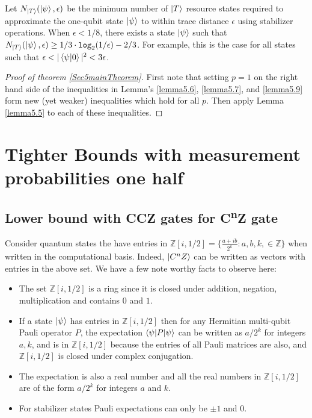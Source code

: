 \documentclass[12pt]{dalthesis}
\begin{document}
\begin{lemma}
\label{lemma5.9}
Let $N_{\ket{T}}(\ket{\psi} , \epsilon)$ be the minimum number of $\ket{T}$ resource states required to approximate the one-qubit state $\ket{\psi}$ to within trace distance $\epsilon$ using stabilizer operations. When $\epsilon < 1/8$, there exists a state $\ket{\psi}$ such that $N_{\ket{T}}(\ket{\psi} , \epsilon) \geq 1/3 \cdot \texttt{log}_2(1/\epsilon) - 2/3$. For example, this is the case for all states such that $\epsilon < |\braket{\psi | 0}|^2 < 3\epsilon$.
\end{lemma}

\begin{proof}[Proof of theorem \ref{Sec5mainTheorem}]
First note that setting $p=1$ on the right hand side of the inequalities in Lemma's   \ref{lemma5.6}, \ref{lemma5.7}, and \ref{lemma5.9} form new (yet weaker) inequalities which hold for all $p$. Then apply Lemma \ref{lemma5.5} to each of these inequalities.
\end{proof}

\chapter{Tighter Bounds with measurement probabilities one half}
\section{Lower bound with CCZ gates for C\textsuperscript{n}Z gate}
Consider quantum states the have entries in $\mathbb{Z}[i, 1/2] = \big\{\frac{a+ib}{2^k}: a, b, k, \in \mathbb{Z} \big\}$ when written in the computational basis. Indeed, $\ket{C^nZ}$ can be written as vectors with entries in the above set. We have a few note worthy facts to observe here:
\begin{itemize}
\item The set $\mathbb{Z}[i, 1/2]$ is a ring since it is closed under addition, negation, multiplication and contains $0$ and $1$.
\item If a state $\ket{\psi}$ has entries in $\mathbb{Z}[i, 1/2]$ then for any Hermitian multi-qubit Pauli operator $P$, the expectation $\braket{\psi | P | \psi}$ can be written as $a/2^k$ for integers $a, k$, and is in $\mathbb{Z}[i, 1/2]$ because the entries of all Pauli matrices are also, and $\mathbb{Z}[i, 1/2]$ is closed under complex conjugation.
\item The expectation is also a real number and all the real numbers in $\mathbb{Z}[i, 1/2]$ are of the form $a/2^k$ for integers $a$ and $k$. 
\item For stabilizer states Pauli expectations can only be $\pm 1$ and $0$.
\end{itemize}
\end{document}
